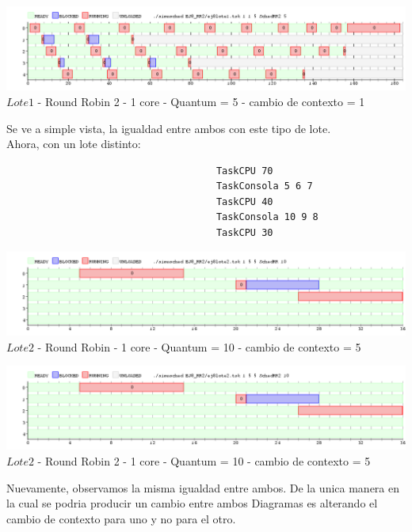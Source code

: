  \begin{center}
    	\includegraphics[width=450pt]{./EJ8_RR2/dif1corerr2.png}
	{$Lote 1$ - Round Robin 2 - 1 core - Quantum = 5 - cambio de contexto = 1}	
 \end{center}
 
 \indent Se ve a simple vista, la igualdad entre ambos con este tipo de lote.\\
 
 \indent Ahora, con un lote distinto:
 
 \begin{verbatim}
                                     TaskCPU 70
                                     TaskConsola 5 6 7
                                     TaskCPU 40
                                     TaskConsola 10 9 8
                                     TaskCPU 30
 \end{verbatim}
 
   \begin{center}
    	\includegraphics[width=450pt]{./EJ8_RR2/dif2corerr.png}
	{$Lote 2$ - Round Robin - 1 core - Quantum = 10 - cambio de contexto = 5}	
 \end{center}
 
 \begin{center}
    	\includegraphics[width=450pt]{./EJ8_RR2/dif2corerr2.png}
	{$Lote 2$ - Round Robin 2 - 1 core - Quantum = 10 - cambio de contexto = 5}	
 \end{center}
 
 \indent Nuevamente, observamos la misma igualdad entre ambos. De la unica manera en la cual se podria producir un cambio
 entre ambos Diagramas es alterando el cambio de contexto para uno y no para el otro.
 
